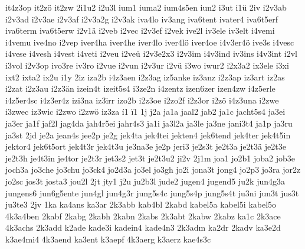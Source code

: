 {    it4z3op
    it2zö
    it2zw
    2i1u2
    i2u3l
    ium1
    iuma2
    ium4s5en
    iun2
    i3ut
    i1ü
    2iv
    i2v3ab
    i2v3ad
    i2v3ae
    i2v3af
    i2v3a2g
    i2v3ak
    iva4lo
    iv3ang
    iva6tent
    ivater4
    iva6t5erf
    iva6term
    iva6t5erw
    i2v1ä
    i2veb
    i2vec
    i2v3ef
    i2vek
    ive2l
    iv3ele
    iv3elt
    i4vemi
    i4vemu
    ive4no
    i2vep
    iver4ha
    iver4he
    iver4lo
    iver4lö
    iver4oe
    i4v3er4ö
    ive3s
    i4vesc
    i4vese
    i4vesh
    i4vest
    i4veti
    i2veu
    i2veü
    i2v3e2x3
    i2v3im
    i4v3ind
    iv3ins
    i4v3int
    i2vl
    i3vol
    i2v3op
    ivo3re
    iv3ro
    i2vue
    i2vun
    i2v3ur
    i2vü
    i3wo
    iwur2
    i2x3a2
    ix3ele
    i3xi
    ixt2
    ixta2
    ix2u
    i1y
    2iz
    iza2b
    i4z3aen
    i2z3ag
    iz5anke
    iz3anz
    i2z3ap
    iz3art
    iz2as
    i2zat
    i2z3au
    i2z3än
    izein4t
    izeit5s4
    i3ze2n
    i4zentz
    izen6zer
    izen4zw
    i4z5erle
    i4z5er4sc
    i4z3er4z
    izi3na
    iz3irr
    izo2b
    i2z3oe
    i2zo2f
    i2z3or
    i2zö
    i4z3una
    i2zwe
    i3zwec
    iz3wic
    i2zwo
    i2zwö
    iz3za
    í1
    ï1
    1j
    j2a
    ja1a
    jaal2
    jab2
    ja1c
    jacht5s4
    ja3ei
    ja3er
    ja1f
    jaf2l
    jag4da
    jah4r5ei
    jahr4s3
    ja1i
    ja3l2a
    ja3le
    ja3ne
    jani3t4
    ja1p
    ja3ru
    ja3st
    2jd
    je2a
    jean4s
    jee2p
    je2g
    jek4ta
    jek4tei
    jekten4
    jek6tend
    jek4ter
    jek4t5in
    jektor4
    jek6t5ort
    jek4t3r
    jek4t3u
    je3na3e
    je2p
    jeri3
    je2s3t
    je2t3a
    je2t3ä
    je2t3e
    je2t3h
    je4t3in
    je4tor
    je2t3r
    jet3s2
    jet3t
    je2t3u2
    ji2v
    2j1m
    joa1
    jo2b1
    joba2
    job3e
    joch3a
    jo3che
    jo3chu
    jo3ck4
    jo2d3a
    jo3el
    jo3gh
    jo2i
    jona3t
    jong4
    jo2p3
    jo3ra
    jor2z
    jo2sc
    jos3t
    josta3
    jou2l
    2jt
    jty1
    j2u
    ju2b3l
    jude2
    jugen4
    jugend5
    ju2k
    jun4g3a
    jungens6
    jun6g5ente
    jun4gl
    jun4g3r
    jung5s4c
    jung5s4p
    jung5s4t
    ju3ni
    jun3t
    jus3t
    ju3te3
    2jv
    1ka
    ka4ans
    ka3ar
    2k3abb
    kab4bl
    2kabd
    kabel5a
    kabel5i
    kabel5o
    4k3a4ben
    2kabf
    2kabg
    2kabh
    2kabn
    2kabs
    2k3abt
    2kabw
    2kabz
    ka1c
    2k3ace
    4k3achs
    2k3add
    k2ade
    kade3i
    kadein4
    kade4n3
    2k3adm
    ka2dr
    2kadv
    ka3e2d
    k3ae4mi4
    4k3aend
    ka3ent
    k3aepf
    4k3aerg
    k3aerz
    kae4s3c
}
